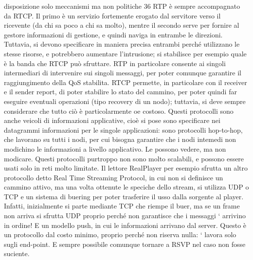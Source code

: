 disposizione solo meccanismi ma non politiche
36
RTP è sempre accompagnato da RTCP. Il primo è un servizio fortemente
erogato dal servitore verso il ricevente (da chi sa poco a chi sa molto), mentre
il secondo serve per fornire al gestore informazioni di gestione, e quindi naviga
in entrambe le direzioni. Tuttavia, si devono specificare in maniera precisa entrambi perché utilizzano le stesse risorse,
e potrebbero aumentare l'intrusione;
si stabilisce per esempio quale è la banda che RTCP può sfruttare. RTP in
particolare consente ai singoli intermediari di intervenire sui singoli messaggi,
per poter comunque garantire il raggiungimento della QoS stabilita. RTCP permette, in particolare con il receiver e il
sender report, di poter stabilire lo stato
del cammino, per poter quindi far eseguire eventuali operazioni (tipo recovery
di un nodo); tuttavia, si deve sempre considerare che tutto ciò è particolarmente
oe
costoso.
Questi protocolli sono anche veicoli di informazioni applicative, cioè si pose
sono specificare nei datagrammi informazioni per le singole applicazioni: sono
protocolli hop-to-hop, che lavorano su tutti i nodi, per cui bisogna garantire che
i nodi intemedi non modichino le informazioni a livello applicativo. Le possono
vedere, ma non modicare.
Questi protocolli purtroppo non sono molto scalabili, e possono essere usati
solo in reti molto limitate. Il lettore RealPlayer per esempio sfrutta un altro
protocollo detto Real Time Streaming Protocol, in cui non si definisce un cammino attivo, ma una volta ottenute le
speciche dello stream, si utilizza UDP
o TCP e un sistema di buering per poter trasferire il usso dalla sorgente al
player. Infatti, inizialmente si parte mediante TCP che riempe il buer, ma se
un frame non arriva si sfrutta UDP proprio perché non garantisce che i messaggi
`
arrivino in ordine! E un modello push, in cui le informazioni arrivano dal server. Questo è un protocollo dal costo
minimo, proprio perché non riserva nulla:
`
lavora solo sugli end-point. E sempre possibile comunque tornare a RSVP nel
caso non fosse suciente.
